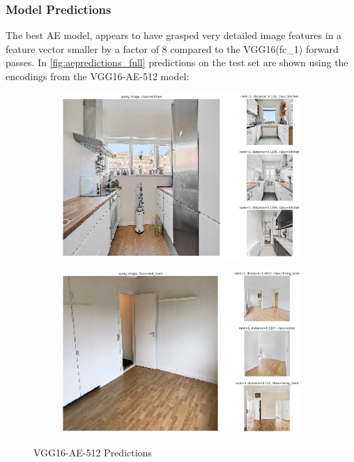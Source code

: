 \subsubsection{Model Predictions}
The best AE model, appears to have grasped very detailed image features in a feature vector smaller by a factor of 8 compared to the VGG16(fc\_1) forward passes.
In \autoref{fig:aepredictions_full} predictions on the test set are shown using the encodings from the VGG16-AE-512 model:
\begin{figure}[H]
  \centering
  \begin{subfigure}[b]{0.47\textwidth}
    \includegraphics[width=\textwidth]{pictures/plots/kitchen_4_test}
  \end{subfigure}
  \begin{subfigure}[b]{0.47\textwidth}
    \includegraphics[width=\textwidth]{pictures/plots/bed_room_237_test}
  \end{subfigure}
  \caption{VGG16-AE-512 Predictions }
  \label{fig:aepredictions_full}
\end{figure}
